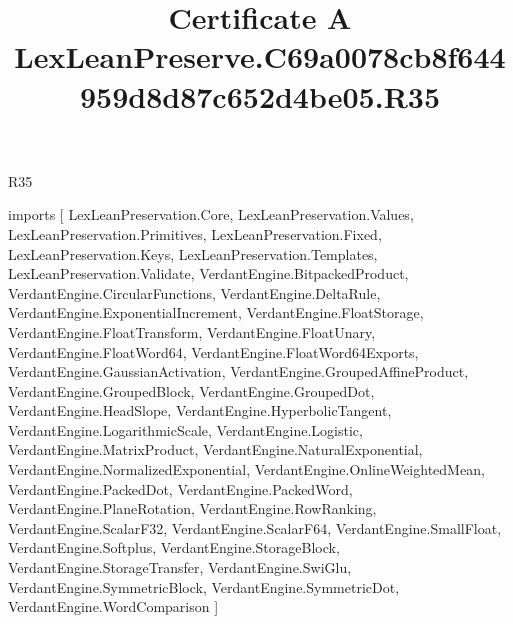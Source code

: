 \begin{lexlean}{R35}
\title{Certificate A LexLeanPreserve.C69a0078cb8f644959d8d87c652d4be05.R35}
\begin{coremodule}
imports [
  LexLeanPreservation.Core,
  LexLeanPreservation.Values,
  LexLeanPreservation.Primitives,
  LexLeanPreservation.Fixed,
  LexLeanPreservation.Keys,
  LexLeanPreservation.Templates,
  LexLeanPreservation.Validate,
  VerdantEngine.BitpackedProduct,
  VerdantEngine.CircularFunctions,
  VerdantEngine.DeltaRule,
  VerdantEngine.ExponentialIncrement,
  VerdantEngine.FloatStorage,
  VerdantEngine.FloatTransform,
  VerdantEngine.FloatUnary,
  VerdantEngine.FloatWord64,
  VerdantEngine.FloatWord64Exports,
  VerdantEngine.GaussianActivation,
  VerdantEngine.GroupedAffineProduct,
  VerdantEngine.GroupedBlock,
  VerdantEngine.GroupedDot,
  VerdantEngine.HeadSlope,
  VerdantEngine.HyperbolicTangent,
  VerdantEngine.LogarithmicScale,
  VerdantEngine.Logistic,
  VerdantEngine.MatrixProduct,
  VerdantEngine.NaturalExponential,
  VerdantEngine.NormalizedExponential,
  VerdantEngine.OnlineWeightedMean,
  VerdantEngine.PackedDot,
  VerdantEngine.PackedWord,
  VerdantEngine.PlaneRotation,
  VerdantEngine.RowRanking,
  VerdantEngine.ScalarF32,
  VerdantEngine.ScalarF64,
  VerdantEngine.SmallFloat,
  VerdantEngine.Softplus,
  VerdantEngine.StorageBlock,
  VerdantEngine.StorageTransfer,
  VerdantEngine.SwiGlu,
  VerdantEngine.SymmetricBlock,
  VerdantEngine.SymmetricDot,
  VerdantEngine.WordComparison
]


\end{coremodule}
\end{lexlean}
